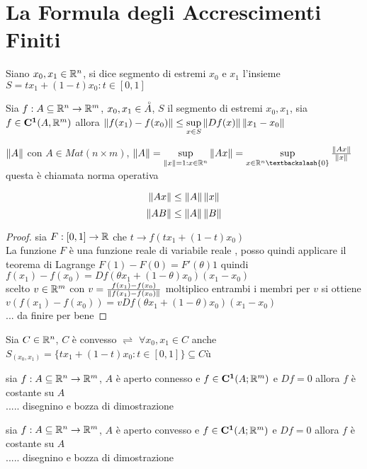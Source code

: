\section{La Formula degli Accrescimenti Finiti}
Siano $x_0,x_1\in \mathbb{R}^n$, si dice segmento di estremi $x_0$ e $x_1$ l'insieme $S={tx_1+(1-t)x_0 : t\in[0,1]}$
\begin{theorem}
	\label{thm:accresc_fin}
	Sia $f:A\subseteq \mathbb{R}^n\rightarrow \mathbb{R}^m$, $x_0,x_1\in\accentset{\circ}{A}$, $S$ il segmento di estremi $x_0,x_1$, sia $f\in \mathbf{C^{1}}(A,\mathbb{R}^m)$ allora $\left\|f(x_1)-f(x_0)\right\|\le \sup\limits_{x\in S}\left\|Df(x)\right\|\left\|x_1-x_0\right\|$
	\begin{observation}
		$\left\|A\right\|$ con $A\in Mat(n\times m)$,  $\norm{A}=\sup\limits_{\norm{x}=1: x\in \R^n}\norm{Ax} = \sup\limits_{x\in \R^n \textbackslash \{0\}}\frac{\norm{Ax} }{\norm{x} } $ questa è chiamata norma operativa
	\end{observation}
	\begin{note}
		$$\left\|Ax\right\| \le \left\|A\right\| \left\|x\right\|  $$
		$$\left\|AB\right\| \le \left\|A\right\| \left\|B\right\|  $$
	\end{note}
	\begin{proof}
		sia $F:[0,1]\rightarrow \mathbb{R}$ che $t\rightarrow f(tx_1+(1-t)x_0)$\\
		La funzione $F$ è una funzione reale di variabile reale , posso quindi applicare il teorema di Lagrange $F(1)-F(0)=F'(\theta)1$ quindi $f(x_1)-f(x_0) = Df(\theta x_1 + (1-\theta)x_0)(x_1-x_0)$\\
		scelto $v\in \mathbb{R}^m$ con $v = \frac{f(x_1)-f(x_0)}{\left\|f(x_1)-f(x_0)\right\| }$ moltiplico entrambi i membri per $v$ si ottiene $v(f(x_1)-f(x_0)) = vDf(\theta x_1 + (1-\theta)x_0)(x_1-x_0)$\\
		... da finire per bene
	\end{proof}
\end{theorem}
Sia $C\in \mathbb{R}^n$, $C$ è convesso $\rightleftharpoons$ $\forall x_0,x_1\in C$ anche $S_(x_0,x_1) = \{tx_1+(1-t)x_0 : t\in[0,1]\}\subseteq C$ù

\proposition
sia $f:A\subseteq \mathbb{R}^n \rightarrow \mathbb{R}^m$, $A$ è aperto connesso e $f\in \mathbf{C^{1}}(A;\mathbb{R}^m)$ e $Df=0$ allora $f$ è costante su $A$\\
..... disegnino e bozza di dimostrazione

\proposition
sia $f:A\subseteq \mathbb{R}^n \rightarrow \mathbb{R}^m$, $A$ è aperto convesso e $f\in \mathbf{C^{1}}(A;\mathbb{R}^m)$ e $Df=0$ allora $f$ è costante su $A$\\
..... disegnino e bozza di dimostrazione

